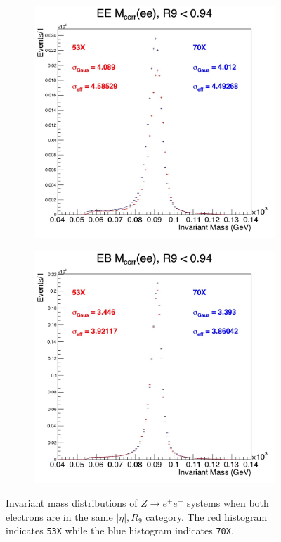 \documentclass[10pt]{article}
\begin{document}
\begin{figure}[h]
\begin{subfigure}[b]{0.35\textwidth}
                  \caption{}
        \end{subfigure}
         \begin{subfigure}[b]{0.35\textwidth}
                \includegraphics[width=\textwidth]{fullRunPlots/Zee_corr_3}
                  \caption{}
        \end{subfigure}
         \begin{subfigure}[b]{0.35\textwidth}
                \includegraphics[width=\textwidth]{fullRunPlots/Zee_corr_4}
                  \caption{}
        \end{subfigure}
        \caption{Invariant mass distributions of $Z\rightarrow e^+e^-$ systems when both electrons are in the same $|\eta|,R_9$ category. The red histogram indicates \texttt{53X} while the blue histogram indicates \texttt{70X}.}\label{ZeeValidation}
\end{figure}
\end{document}
